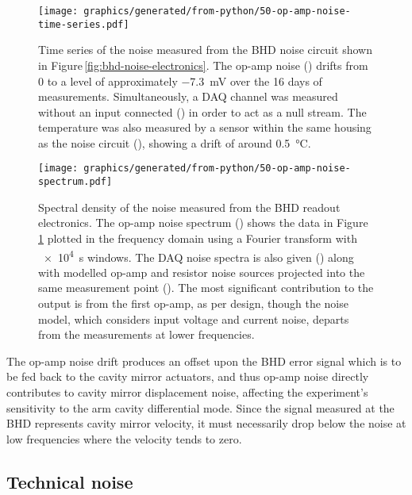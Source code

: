 \begin{figure}
  \centering
  \texttt{[image: graphics/generated/from-python/50-op-amp-noise-time-series.pdf]}
  \caption[Time series of the noise measured from the balanced homodyne readout electronics]{\label{fig:op-amp-noise-time-series}Time series of the noise measured from the BHD noise circuit shown in Figure\,\ref{fig:bhd-noise-electronics}. The op-amp noise () drifts from \num{0} to a level of approximately \SI{-7.3}{\milli\volt} over the 16 days of measurements. Simultaneously, a DAQ channel was measured without an input connected () in order to act as a null stream. The temperature was also measured by a sensor within the same housing as the noise circuit (), showing a drift of around \SI{0.5}{\celsius}.}
\end{figure}

\begin{figure}
  \centering
  \texttt{[image: graphics/generated/from-python/50-op-amp-noise-spectrum.pdf]}
  \caption[Spectral density of the noise measured from the balanced homodyne readout electronics]{\label{fig:op-amp-noise-spectrum}Spectral density of the noise measured from the BHD readout electronics. The op-amp noise spectrum () shows the data in Figure\,\ref{fig:op-amp-noise-time-series} plotted in the frequency domain using a Fourier transform with \SI{e4}{\second} windows. The DAQ noise spectra is also given () along with modelled op-amp and resistor noise sources projected into the same measurement point (). The most significant contribution to the output is from the first op-amp, as per design, though the noise model, which considers input voltage and current noise, departs from the measurements at lower frequencies.}
\end{figure}

The op-amp noise drift produces an offset upon the \gls{BHD} error signal which is to be fed back to the cavity mirror actuators, and thus op-amp noise directly contributes to cavity mirror displacement noise, affecting the experiment's sensitivity to the arm cavity differential mode. Since the signal measured at the \gls{BHD} represents cavity mirror velocity, it must necessarily drop below the noise at low frequencies where the velocity tends to zero.

\subsection{Technical noise}

